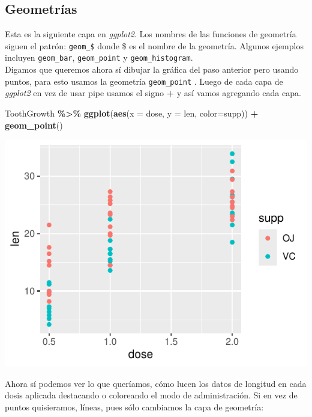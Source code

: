 \documentclass[
]{book}
\newenvironment{Shaded}{\begin{snugshade}}{\end{snugshade}}
\newcommand{\AttributeTok}[1]{\textcolor[rgb]{0.13,0.29,0.53}{#1}}
\newcommand{\FunctionTok}[1]{\textcolor[rgb]{0.13,0.29,0.53}{\textbf{#1}}}
\newcommand{\NormalTok}[1]{#1}
\newcommand{\SpecialCharTok}[1]{\textcolor[rgb]{0.81,0.36,0.00}{\textbf{#1}}}
\begin{document}
\subsection{Geometrías}\label{geometruxedas}

Esta es la siguiente capa en \emph{ggplot2}.
Los nombres de las funciones de geometría siguen el patrón: \texttt{geom\_\$} donde \$ es el nombre de la geometría.
Algunos ejemplos incluyen \texttt{geom\_bar}, \texttt{geom\_point} y \texttt{geom\_histogram}.\\
Digamos que queremos ahora sí dibujar la gráfica del paso anterior pero usando puntos, para esto usamos la geometría \texttt{geom\_point} .
Luego de cada capa de \emph{ggplot2} en vez de usar pipe usamos el signo \textbf{+} y así vamos agregando cada capa.\\

\begin{Shaded}
\begin{Highlighting}[]
\NormalTok{ToothGrowth }\SpecialCharTok{\%\textgreater{}\%} \FunctionTok{ggplot}\NormalTok{(}\FunctionTok{aes}\NormalTok{(}\AttributeTok{x =}\NormalTok{ dose, }\AttributeTok{y =}\NormalTok{ len, }\AttributeTok{color=}\NormalTok{supp)) }\SpecialCharTok{+}
  \FunctionTok{geom\_point}\NormalTok{()}
\end{Highlighting}
\end{Shaded}

\begin{center}\includegraphics{_main_files/figure-latex/unnamed-chunk-206-1} \end{center}

Ahora sí podemos ver lo que queríamos, cómo lucen los datos de longitud en cada dosis aplicada destacando o coloreando el modo de administración.
Si en vez de puntos quisieramos, líneas, pues sólo cambiamos la capa de geometría:
\end{document}
